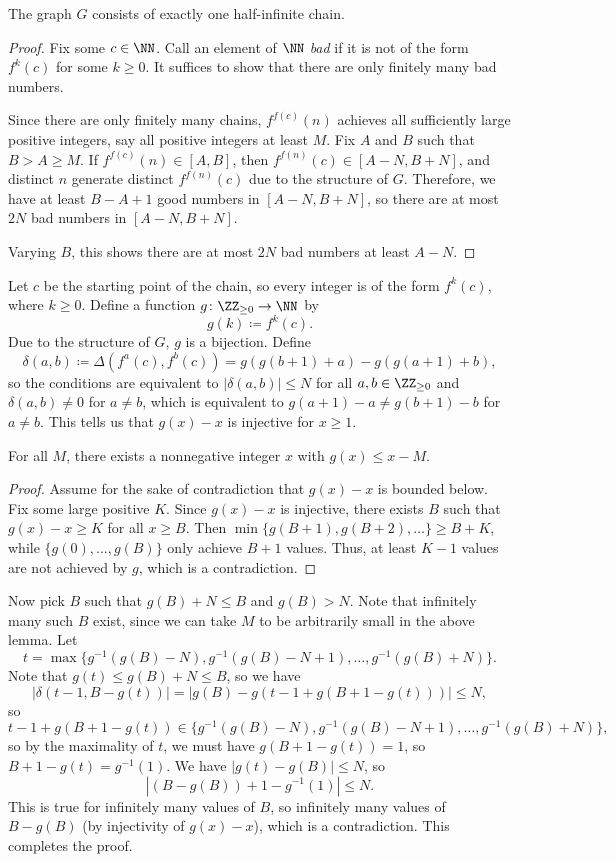 \begin{claim*}
  The graph $G$ consists of exactly one half-infinite chain.
\end{claim*}
\begin{proof}
  Fix some $c\in\NN$.
  Call an element of $\NN$ \textit{bad} if
  it is not of the form $f^k(c)$ for some $k\ge 0$.
  It suffices to show that there are only finitely many bad numbers.

  Since there are only finitely many chains, $f^{f(c)}(n)$ achieves all
  sufficiently large positive integers, say all positive integers at least $M$.
  Fix $A$ and $B$ such that $B>A\ge M$.
  If $f^{f(c)}(n)\in[A,B]$, then $f^{f(n)}(c)\in[A-N,B+N]$,
  and distinct $n$ generate distinct $f^{f(n)}(c)$ due to the structure of $G$.
  Therefore, we have at least $B-A+1$ good numbers in $[A-N,B+N]$,
  so there are at most $2N$ bad numbers in $[A-N,B+N]$.

  Varying $B$, this shows there are at most $2N$ bad numbers at least $A-N$.
\end{proof}

Let $c$ be the starting point of the chain,
so every integer is of the form $f^k(c)$, where $k\geq 0$.
Define a function $g \colon \ZZ_{\ge 0}\to\NN$
by \[ g(k) \coloneqq f^k(c). \]
Due to the structure of $G$, $g$ is a bijection.
Define
\[\delta(a,b) \coloneqq \Delta(f^a(c),f^b(c)) = g(g(b+1)+a)-g(g(a+1)+b),\]
so the conditions are equivalent to $|\delta(a,b)|\le N$
for all $a,b\in\ZZ_{\ge 0}$ and $\delta(a,b)\ne 0$ for $a\ne b$,
which is equivalent to $g(a+1)-a\ne g(b+1)-b$ for $a\ne b$.
This tells us that $g(x)-x$ is injective for $x\ge 1$.

\begin{lemma*}
  For all $M$, there exists a nonnegative integer $x$ with $g(x)\leq x-M$.
\end{lemma*}
\begin{proof}
  Assume for the sake of contradiction that $g(x)-x$ is bounded below.
  Fix some large positive $K$.
  Since $g(x)-x$ is injective,
  there exists $B$ such that $g(x)-x\geq K$ for all $x\geq B$.
  Then $\min \{g(B+1),g(B+2),\dots\} \ge B+K$,
  while $\{g(0),\dots,g(B)\}$ only achieve $B+1$ values.
  Thus, at least $K-1$ values are not achieved by $g$, which is a contradiction.
\end{proof}

Now pick $B$ such that $g(B)+N\le B$ and $g(B) > N$.
Note that infinitely many such $B$ exist,
since we can take $M$ to be arbitrarily small in the above lemma.
Let
\[ t = \max \{g^{-1}(g(B)-N), g^{-1}(g(B)-N+1), \dots, g^{-1}(g(B)+N)\}. \]
Note that $g(t)\le g(B)+N\le B$, so we have
\[ |\delta(t-1,B-g(t))| = |g(B)-g(t-1+g(B+1-g(t)))| \le N, \]
so
\[ t-1+g(B+1-g(t)) \in
  \{g^{-1}(g(B)-N),g^{-1}(g(B)-N+1),\dots,g^{-1}(g(B)+N)\},\]
so by the maximality of $t$, we must have $g(B+1-g(t))=1$,
so $B+1-g(t)=g^{-1}(1)$.
We have $|g(t)-g(B)|\le N$, so
\[|(B-g(B))+1-g^{-1}(1)|\le N.\]
This is true for infinitely many values of $B$,
so infinitely many values of $B-g(B)$ (by injectivity of $g(x)-x$),
which is a contradiction.
This completes the proof.
